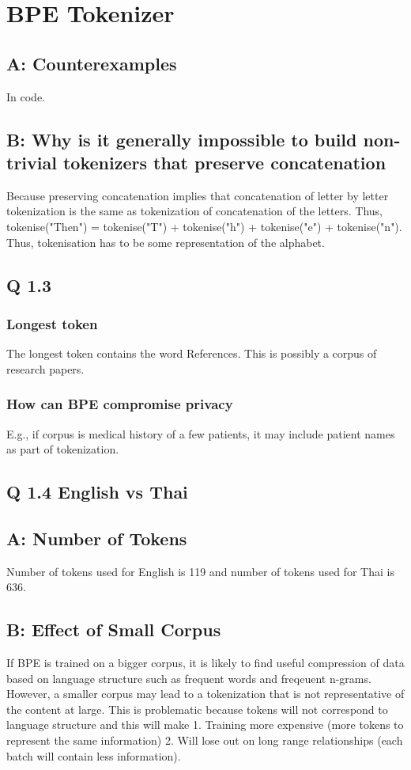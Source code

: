 \documentclass[11pt]{article}
\author{Anshul}
\date{\today}
\title{}
\begin{document}
\tableofcontents

\section{BPE Tokenizer}
\label{sec:org0ea10dd}
\subsection{A: Counterexamples}
\label{sec:org0dd6402}
In code.
\subsection{B: Why is it generally impossible to build non-trivial tokenizers that preserve concatenation}
\label{sec:orgfc29e01}
Because preserving concatenation implies that concatenation of letter by letter tokenization is the same as tokenization of concatenation of the letters. Thus, tokenise("Then") = tokenise("T") + tokenise("h") + tokenise("e") + tokenise("n"). Thus, tokenisation has to be some representation of the alphabet.
\subsection{Q 1.3}
\label{sec:org60ce2a2}
\subsubsection{Longest token}
\label{sec:org9cb8bf8}
The longest token contains the word References. This is possibly a corpus of research papers.
\subsubsection{How can BPE compromise privacy}
\label{sec:orga31aaf0}
E.g., if corpus is medical history of a few patients, it may include patient names as part of tokenization.
\subsection{Q 1.4 English vs Thai}
\label{sec:orgc281dd0}
\subsection{A: Number of Tokens}
\label{sec:orgd8cf6f6}
Number of tokens used for English is 119 and number of tokens used for Thai is 636.
\subsection{B: Effect of Small Corpus}
\label{sec:org4cf2784}
If BPE is trained on a bigger corpus, it is likely to find useful compression of data based on language structure such as frequent words and freqeuent n-grams. However, a smaller corpus may lead to a tokenization that is not representative of the content at large.  This is problematic because tokens will not correspond to language structure and this will make 1. Training more expensive (more tokens to represent the same information) 2. Will lose out on long range relationships (each batch will contain less information).
\end{document}
